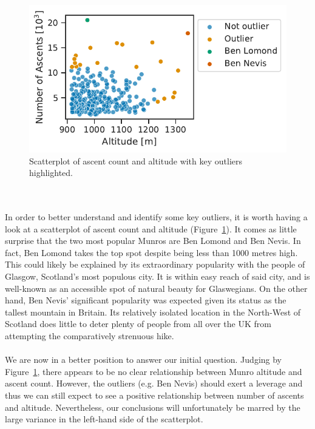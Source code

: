 \documentclass[11pt,a4paper]{article}
\begin{document}
\begin{figure} [h!]
  \centering
  \includegraphics{report/scatterplot.pdf}
  \caption{Scatterplot of ascent count and altitude with key outliers highlighted.}
  \label{fds-project-template:fig:scatterplot}
\end{figure} \\ \\
In order to better understand and identify some key outliers, it is worth having a look at a scatterplot of ascent count and altitude (Figure~\ref{fds-project-template:fig:scatterplot}). It comes as little surprise that the two most popular Munros are Ben Lomond and Ben Nevis. In fact, Ben Lomond takes the top spot despite being less than 1000 metres high. This could likely be explained by its extraordinary popularity with the people of Glasgow, Scotland's most populous city. It is within easy reach of said city, and is well-known as an accessible spot of natural beauty for Glaswegians. On the other hand, Ben Nevis' significant popularity was expected given its status as the tallest mountain in Britain. Its relatively isolated location in the North-West of Scotland does little to deter plenty of people from all over the UK from attempting the comparatively strenuous hike. \\ \\
We are now in a better position to answer our initial question. Judging by Figure~\ref{fds-project-template:fig:scatterplot}, there appears to be no clear relationship between Munro altitude and ascent count. However, the outliers (e.g. Ben Nevis) should exert a leverage and thus we can still expect to see a positive relationship between number of ascents and altitude. Nevertheless, our conclusions will unfortunately be marred by the large variance in the left-hand side of the scatterplot. \\ \\
\end{document}
